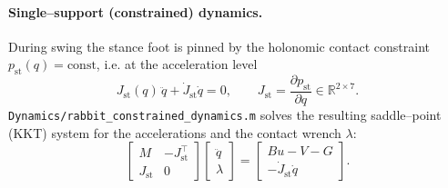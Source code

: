 \documentclass[11pt,a4paper]{article}
\newcommand{\fname}[1]{\texttt{#1}}          %
\begin{document}
\paragraph{Single--support (constrained) dynamics.}
During swing the stance foot is pinned by the holonomic contact constraint
$p_{\mathrm{st}}(q)=\text{const}$, i.e. at the acceleration level
\begin{equation}
  J_{\mathrm{st}}(q)\,\ddot q + \dot J_{\mathrm{st}}\dot q = 0,
  \qquad J_{\mathrm{st}} = \frac{\partial p_{\mathrm{st}}}{\partial q}\in\mathbb{R}^{2\times 7}.
\end{equation}
\fname{Dynamics/rabbit\_constrained\_dynamics.m} solves the resulting
saddle--point (KKT) system for the accelerations and the contact wrench
$\lambda$:
\begin{equation}
  \begin{bmatrix} M & -J_{\mathrm{st}}^{\top} \\ J_{\mathrm{st}} & 0 \end{bmatrix}
  \begin{bmatrix} \ddot q \\ \lambda \end{bmatrix}
  =
  \begin{bmatrix} B u - V - G \\ -\dot J_{\mathrm{st}}\dot q \end{bmatrix}.
\end{equation}

\end{document}
